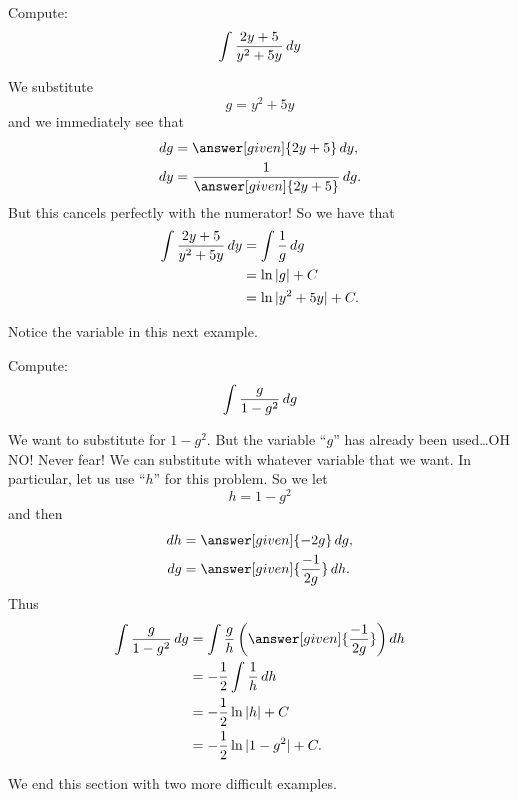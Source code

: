 \documentclass{ximera}
\begin{document}
\begin{example}
Compute:
\[
\int \frac{2y+5}{y^{2}+5y} \mathop{}\!d y
\]
\begin{explanation}
We substitute
\[
g = y^{2}+5y
\]
and we immediately see that
\begin{align*}
  \d g &= \answer[given]{2y+5} \d y,\\
  \d y &= \frac{1}{\answer[given]{2y+5}} \d g.
\end{align*}
But this cancels perfectly with the numerator!  
So we have that
\begin{align*}
\int \frac{2y+5}{y^{2}+5y} \mathop{}\!d y &= \int \frac{1}{g} \mathop{}\!d g  \\
&= \ln|g| + C  \\
&= \ln| y^{2}+5y | + C.
\end{align*}
\end{explanation}
\end{example}



Notice the variable in this next example.


\begin{example}\label{key example}
Compute:
\[
\int \frac{g}{1-g^2} \mathop{}\!d g
\]
\begin{explanation}
We want to substitute for $1-g^2$.  
But the variable ``$g$'' has already been used\dots OH NO!
Never fear! We can substitute with whatever variable that we want.  
In particular, let us use ``$h$'' for this problem.  
So we let
\[
h = 1 - g^2
\]
and then
\begin{align*}
  \d h &= \answer[given]{-2g} \d g,\\
  \d g &= \answer[given]{\frac{-1}{2g}} \d h.
\end{align*}
Thus
\begin{align*}
\int \frac{g}{1-g^2} \d g &= \int \frac{g}{h} \left( \answer[given]{\frac{-1}{2g}} \right) \d h  \\
&= - \frac{1}{2} \int \frac{1}{h} \d h  \\
&= - \frac{1}{2} \ln|h| + C  \\
&= - \frac{1}{2} \ln|1-g^2| + C.
\end{align*}
\end{explanation}
\end{example}





We end this section with two more difficult examples.
\end{document}
